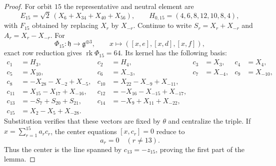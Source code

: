 \documentclass[10pt,a4paper]{amsart}
\numberwithin{equation}{section}
\newcommand{\rk}{\operatorname{rk}}
\newcommand{\fg}{\mathfrak g}
\newcommand{\fh}{\mathfrak h}
\begin{document}
\begin{proof}
For orbit $15$ the representative and neutral element are
\[
 E_{15}=\sqrt2\,(X_6+X_{34}+X_{40}+X_{56}),
 \qquad
 H_{0,15}=(4,6,8,12,10,8,4),
\]
with $F_{15}$ obtained by replacing $X_r$ by $X_{-r}$.  Continue to write
$S_r=X_r+X_{-r}$ and $A_r=X_r-X_{-r}$.  For
\[
 \Phi_{15}:\fh\longrightarrow\fg^{\oplus3},\qquad
 x\longmapsto([x,e],[x,d],[x,f]),
\]
exact row reduction gives $\rk\Phi_{15}=64$.  Its kernel has the following
basis:
\begingroup
\small
\begin{align*}
 c_1&=H_3,&c_2&=H_4,&c_3&=X_3,&c_4&=X_4,\\
 c_5&=X_{10},&c_6&=X_{-3},&c_7&=X_{-4},&c_9&=X_{-10},\\
 c_8&=-X_{28}-X_{-2}+X_{-5},
 &c_{10}&=X_{22}-X_{-9}+X_{-11},\\
 c_{11}&=X_{15}-X_{17}+X_{-16},
 &c_{12}&=-X_{16}-X_{-15}+X_{-17},\\
 c_{13}&=-S_7+S_{20}+S_{21},
 &c_{14}&=-X_9+X_{11}+X_{-22},\\
 c_{15}&=X_2-X_5+X_{-28}.
\end{align*}
\endgroup
Substitution verifies that these vectors are fixed by $\theta$ and centralize
the triple.  If $x=\sum_{r=1}^{15}a_rc_r$, the center equations
$[x,c_r]=0$ reduce to
\[
 a_r=0\quad(r\neq13).
\]
Thus the center is the line spanned by $c_{13}=-z_{15}$, proving the first
part of the lemma.


\end{proof}
\end{document}
